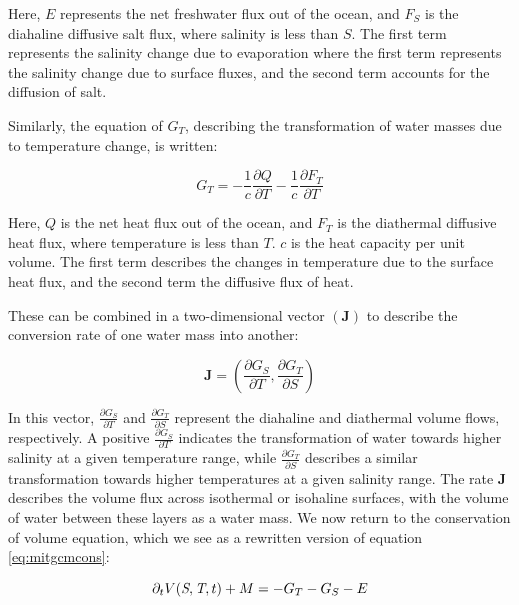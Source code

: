\documentclass[draft]{agujournal2019}
\begin{document}
Here, $E$ represents the net freshwater flux out of the ocean, and $F_S$ is the diahaline diffusive salt flux, where salinity is less than $S$. The first term represents the salinity change due to evaporation
where the first term represents the salinity change due to surface fluxes, and the second term accounts for the diffusion of salt. 

Similarly, the equation of $G_T$, describing the transformation of water masses due to temperature change, is written:

\begin{equation}
G_T = - \frac{1}{c} \frac{\partial Q}{\partial T} - \frac{1}{c} \frac{\partial F_T}{\partial T} \label{eq:g_t}
\end{equation}

Here, $Q$ is the net heat flux out of the ocean, and $F_T$ is the diathermal diffusive heat flux, where temperature is less than $T$. $c$ is the heat capacity per unit volume. The first term describes the changes in temperature due to the surface heat flux, and the second term the diffusive flux of heat.

These can be combined in a two-dimensional vector $(\mathbf{J})$ to describe the conversion rate of one water mass into another:

\begin{equation}
\mathbf{J} = 
\left( \frac{\partial G_S}{\partial T}, \frac{\partial G_T}{\partial S} \right)
\end{equation}

In this vector, $\frac{\partial G_S}{\partial T}$ and $\frac{\partial G_T}{\partial S}$ represent the diahaline and diathermal volume flows, respectively. A positive $\frac{\partial G_S}{\partial T}$ indicates the transformation of water towards higher salinity at a given temperature range, while $\frac{\partial G_T}{\partial S}$ describes a similar transformation towards higher temperatures at a given salinity range. The rate $\mathbf{J}$ describes the volume flux across isothermal or isohaline surfaces, with the volume of water between these layers as a water mass. We now return to the conservation of volume equation, which we see as a rewritten version of equation \ref{eq:mitgcmcons}:

\begin{equation}
    \partial_t{V}(\emph{S},\emph{T},t) + M = - G_T - G_S - E \label{eq:pcons}
\end{equation}
\end{document}
